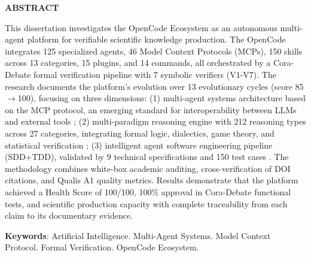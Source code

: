 \documentclass[12pt,a4paper,sumario=tradicional]{abntex2}
\begin{document}
\newpage
\begin{center}
\textbf{ABSTRACT}
\end{center}

This dissertation investigates the OpenCode Ecosystem as an autonomous multi-agent platform for verifiable scientific knowledge production. The OpenCode integrates 125 specialized agents, 46 Model Context Protocols (MCPs), 150 skills across 13 categories, 15 plugins, and 14 commands, all orchestrated by a Cora-Debate formal verification pipeline with 7 symbolic verifiers (V1-V7). The research documents the platform's evolution over 13 evolutionary cycles (score 85$\rightarrow$100), focusing on three dimensions: (1) multi-agent systems architecture based on the MCP protocol, an emerging standard for interoperability between LLMs and external tools \cite{ayyagari2025mcp, lei2026survey}; (2) multi-paradigm reasoning engine with 212 reasoning types across 27 categories, integrating formal logic, dialectics, game theory, and statistical verification \cite{antero2024harnessing, xu2026optimisation}; (3) intelligent agent software engineering pipeline (SDD+TDD), validated by 9 technical specifications and 150 test cases \cite{garfinkel2026acm, rasheed2026llm}. The methodology combines white-box academic auditing, cross-verification of DOI citations, and Qualis A1 quality metrics. Results demonstrate that the platform achieved a Health Score of 100/100, 100\% approval in Cora-Debate functional tests, and scientific production capacity with complete traceability from each claim to its documentary evidence.

\vspace{0.5cm}
\textbf{Keywords}: Artificial Intelligence. Multi-Agent Systems. Model Context Protocol. Formal Verification. OpenCode Ecosystem.

\newpage
\listoffigures
\vspace{1cm}
\listoftables

\newpage
\tableofcontents
\newpage

\end{document}
